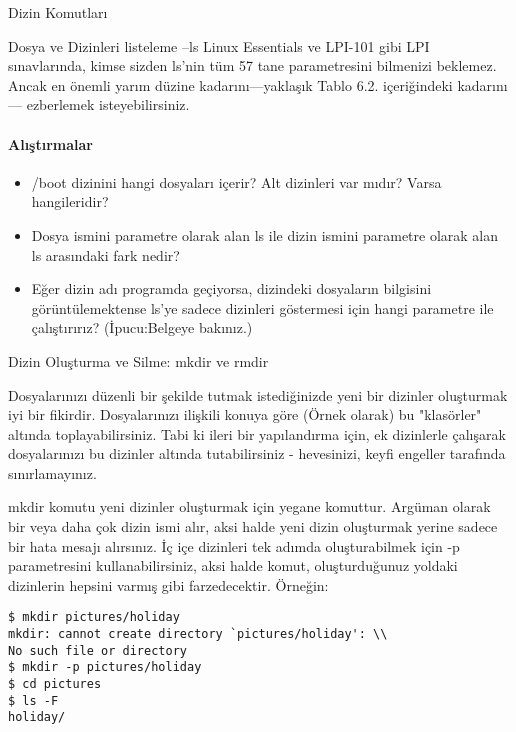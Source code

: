 \begin{section}{Dizin Komutları}
\begin{subsection}{Dosya ve Dizinleri listeleme --ls}
Linux Essentials ve LPI-101 gibi LPI sınavlarında, kimse sizden ls'nin tüm 57 tane parametresini bilmenizi beklemez. Ancak en önemli yarım düzine kadarını—yaklaşık Tablo 6.2. içeriğindeki kadarını— ezberlemek isteyebilirsiniz.
\paragraph{Alıştırmalar}{
\begin{itemize}
 \item /boot dizinini hangi dosyaları içerir? Alt dizinleri var mıdır? Varsa hangileridir?
 \item Dosya ismini parametre olarak alan ls ile dizin ismini parametre olarak alan ls arasındaki fark nedir?
 \item Eğer dizin adı programda geçiyorsa, dizindeki dosyaların bilgisini görüntülemektense ls'ye sadece dizinleri göstermesi için hangi parametre ile çalıştırırız? (İpucu:Belgeye bakınız.)
\end{itemize}}
\end{subsection}
\begin{subsection}{Dizin Oluşturma ve Silme: mkdir ve rmdir}

Dosyalarınızı düzenli bir şekilde tutmak istediğinizde yeni bir dizinler oluşturmak iyi bir fikirdir. Dosyalarınızı ilişkili konuya göre (Örnek olarak) bu "klasörler" altında toplayabilirsiniz. Tabi ki ileri bir yapılandırma için, ek dizinlerle çalışarak dosyalarınızı bu dizinler altında tutabilirsiniz - hevesinizi, keyfi engeller tarafında sınırlamayınız.

mkdir komutu yeni dizinler oluşturmak için yegane komuttur. Argüman olarak bir veya daha çok dizin ismi alır, aksi halde yeni dizin oluşturmak yerine sadece bir hata mesajı alırsınız. İç içe dizinleri tek adımda oluşturabilmek için -p parametresini kullanabilirsiniz, aksi halde komut, oluşturduğunuz yoldaki dizinlerin hepsini varmış gibi farzedecektir. Örneğin:
\begin{verbatim}
$ mkdir pictures/holiday
mkdir: cannot create directory `pictures/holiday': \\
No such file or directory
$ mkdir -p pictures/holiday
$ cd pictures
$ ls -F
holiday/
\end{verbatim}
\end{subsection}
\end{section}

